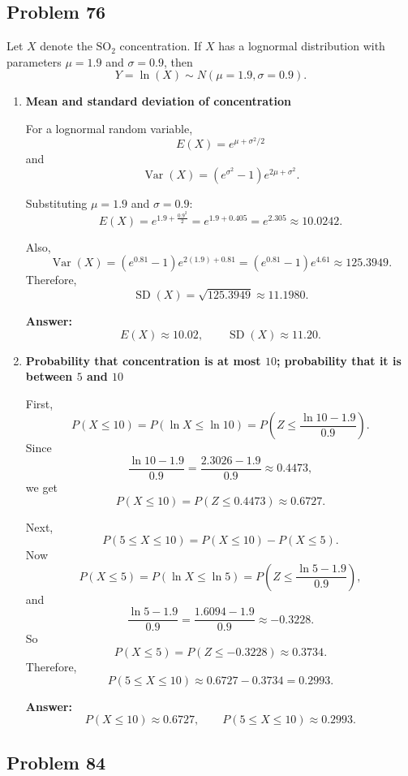 \subsection*{Problem 76}

Let $X$ denote the $\text{SO}_2$ concentration. If $X$ has a lognormal distribution with parameters $\mu=1.9$ and $\sigma=0.9$, then
\[
Y=\ln(X)\sim N(\mu=1.9,\sigma=0.9).
\]

\begin{enumerate}
    \item[(a)] \textbf{Mean and standard deviation of concentration}

    For a lognormal random variable,
    \[
    E(X)=e^{\mu+\sigma^2/2}
    \]
    and
    \[
    \operatorname{Var}(X)=\left(e^{\sigma^2}-1\right)e^{2\mu+\sigma^2}.
    \]

    Substituting $\mu=1.9$ and $\sigma=0.9$:
    \[
    E(X)=e^{1.9+\frac{0.9^2}{2}}=e^{1.9+0.405}=e^{2.305}\approx 10.0242.
    \]

    Also,
    \[
    \operatorname{Var}(X)=\left(e^{0.81}-1\right)e^{2(1.9)+0.81}
    =\left(e^{0.81}-1\right)e^{4.61}\approx 125.3949.
    \]
    Therefore,
    \[
    \operatorname{SD}(X)=\sqrt{125.3949}\approx 11.1980.
    \]

    \textbf{Answer:}
    \[
    E(X)\approx 10.02,\qquad \operatorname{SD}(X)\approx 11.20.
    \]

    \item[(b)] \textbf{Probability that concentration is at most $10$; probability that it is between $5$ and $10$}

    First,
    \[
    P(X\le 10)=P(\ln X\le \ln 10)
    =P\left(Z\le \frac{\ln 10-1.9}{0.9}\right).
    \]
    Since
    \[
    \frac{\ln 10-1.9}{0.9}=\frac{2.3026-1.9}{0.9}\approx 0.4473,
    \]
    we get
    \[
    P(X\le 10)=P(Z\le 0.4473)\approx 0.6727.
    \]

    Next,
    \[
    P(5\le X\le 10)=P(X\le 10)-P(X\le 5).
    \]
    Now
    \[
    P(X\le 5)=P(\ln X\le \ln 5)
    =P\left(Z\le \frac{\ln 5-1.9}{0.9}\right),
    \]
    and
    \[
    \frac{\ln 5-1.9}{0.9}=\frac{1.6094-1.9}{0.9}\approx -0.3228.
    \]
    So
    \[
    P(X\le 5)=P(Z\le -0.3228)\approx 0.3734.
    \]
    Therefore,
    \[
    P(5\le X\le 10)\approx 0.6727-0.3734=0.2993.
    \]

    \textbf{Answer:}
    \[
    P(X\le 10)\approx 0.6727,
    \qquad
    P(5\le X\le 10)\approx 0.2993.
    \]
\end{enumerate}

\subsection*{Problem 84}

